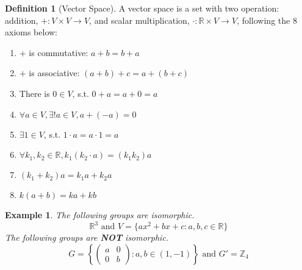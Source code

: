 \documentclass{article}
\theoremstyle{MyNonumberplain}
\theoremstyle{break}
\newcommand{\infixand}{\text{ and }}
\theoremstyle{break}
\newtheorem{example}{Example}[section]
\theoremstyle{break}
\theoremstyle{definition}
\theoremstyle{break}
\newtheorem{definition}{Definition}[section]
\begin{document}
\begin{defbox}
    \begin{definition}[Vector Space]
        A vector space is a set with two operation: addition, $+ : V \times V
        \rightarrow V$, and scalar multiplication, $\cdot : \mathbb{R} \times V
        \rightarrow V$, following the 8 axioms below:\bigskip
        \begin{enumerate}
        \item $+$ is commutative: $a + b = b + a$\bigskip
        
        \item $+$ is associative: $(a + b) + c = a + (b + c)$\bigskip
        
        \item There is $0 \in V$, s.t. $0 + a = a + 0 = a$\bigskip
        
        \item $\forall a \in V, \exists !a \in V, a + (- a) = 0$\bigskip
        
        \item $\exists 1 \in V$, s.t. $1 \cdot a = a \cdot 1 = a$\bigskip
        
        \item $\forall k_1, k_2 \in \mathbb{R}, k_1 (k_2 \cdot a) = (k_1 k_2) a$\bigskip
        
        \item $(k_1 + k_2) a = k_1 a + k_2 a$\bigskip
        
        \item $k (a + b) = k a + k b$
        \end{enumerate}
    \end{definition}
\end{defbox}

\begin{expbox}
    \begin{example}
        The following groups are isomorphic. 
        \[ \mathbb{R}^3 \infixand V = \{ a x^2 + b x + c : a, b, c \in \mathbb{R} \}
        \]
        The following groups are \textbf{NOT} isomorphic.
        \[ G = \left\{ \left(\begin{array}{cc}
            a & 0\\
            0 & b
        \end{array}\right) : a, b \in (1, - 1) \right\} \infixand G' =\mathbb{Z}_4
        \]
    \end{example}
\end{expbox}

\newpage
\end{document}
